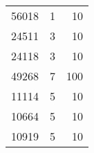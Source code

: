 \begin{figure}[h]
\begin{floatrow}
{\begin{tabular}{rrr}
      56018 &           1 &        10 \\
      24511 &           3 &        10 \\
      24118 &           3 &        10 \\
      49268 &           7 &       100 \\
      11114 &           5 &        10 \\
      10664 &           5 &        10 \\
      10919 &           5 &        10 \\
\bottomrule
\end{tabular}
        }         
    \end{floatrow}
\end{figure}





